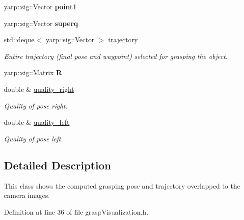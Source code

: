 \begin{DoxyCompactItemize}
\item 
yarp\+::sig\+::\+Vector {\bfseries point1}\label{classGraspVisualization_a0a87a52dda56b81b1b6f7d36c969672c}

\item 
yarp\+::sig\+::\+Vector {\bfseries superq}\label{classGraspVisualization_a38fa19f89c4185545bc35be510ad6158}

\item 
std\+::deque$<$ yarp\+::sig\+::\+Vector $>$ \hyperlink{classGraspVisualization_a7a9b020ba00e06ffc1d272214697a6b7}{trajectory}\label{classGraspVisualization_a7a9b020ba00e06ffc1d272214697a6b7}

\begin{DoxyCompactList}\small\item\em Entire trajectory (final pose and waypoint) selected for grasping the object. \end{DoxyCompactList}\item 
yarp\+::sig\+::\+Matrix {\bfseries R}\label{classGraspVisualization_a0171ee2be1eb60dde9f889313b247658}

\item 
double \& \hyperlink{classGraspVisualization_aa82104f77a9903438727132275401f96}{quality\+\_\+right}\label{classGraspVisualization_aa82104f77a9903438727132275401f96}

\begin{DoxyCompactList}\small\item\em Quality of pose right. \end{DoxyCompactList}\item 
double \& \hyperlink{classGraspVisualization_a773050ce006cffa999ffc3aeea671752}{quality\+\_\+left}\label{classGraspVisualization_a773050ce006cffa999ffc3aeea671752}

\begin{DoxyCompactList}\small\item\em Quality of pose left. \end{DoxyCompactList}\end{DoxyCompactItemize}


\subsection{Detailed Description}
This class shows the computed grasping pose and trajectory overlapped to the camera images. 

Definition at line 36 of file grasp\+Visualization.\+h.



